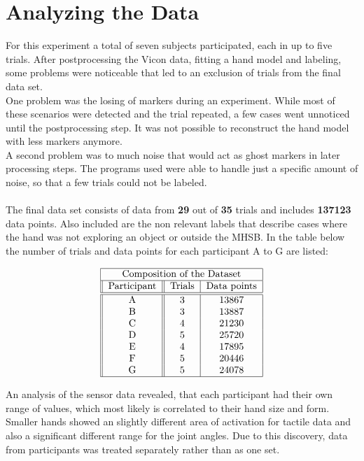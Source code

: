 \section{Analyzing the Data}
For this experiment a total of seven subjects participated, each in up to five trials. After postprocessing the Vicon data, fitting a hand model and labeling, some problems were noticeable that led to an exclusion of trials from the final data set.\\
One problem was the losing of markers during an experiment. While most of these scenarios were detected and the trial repeated, a few cases went unnoticed until the postprocessing step. It was not possible to reconstruct the hand model with less markers anymore.\\
A second problem was to much noise that would act as ghost markers in later processing steps. The programs used were able to handle just a specific amount of noise, so that a few trials could not be labeled.\\
\\
The final data set consists of data from \textbf{29} out of \textbf{35} trials and includes \textbf{137123} data points. Also included are the non relevant labels that describe cases where the hand was not exploring an object or outside the MHSB. In the table below the number of trials and data points for each participant A to G are listed:   

\begin{align}
	\label{database}
	\begin{tabular}{||c||c|c|c}
		\hline
		\multicolumn{3}{|c|}{Composition of the Dataset} \\
		\hline
		Participant & Trials & Data points \\
		\hline\hline
		A & 3 & 13867 \\
		B & 3 & 13887 \\
		C & 4 & 21230 \\
		D & 5 & 25720 \\
		E & 4 & 17895 \\
		F & 5 & 20446 \\
		G & 5 & 24078 \\
		\hline
	\end{tabular}
\end{align} 

An analysis of the sensor data revealed, that each participant had their own range of values, which most likely is correlated to their hand size and form. Smaller hands showed an slightly different area of activation for tactile data and also a significant different range for the joint angles. Due to this discovery, data from participants was treated separately rather than as one set. 
